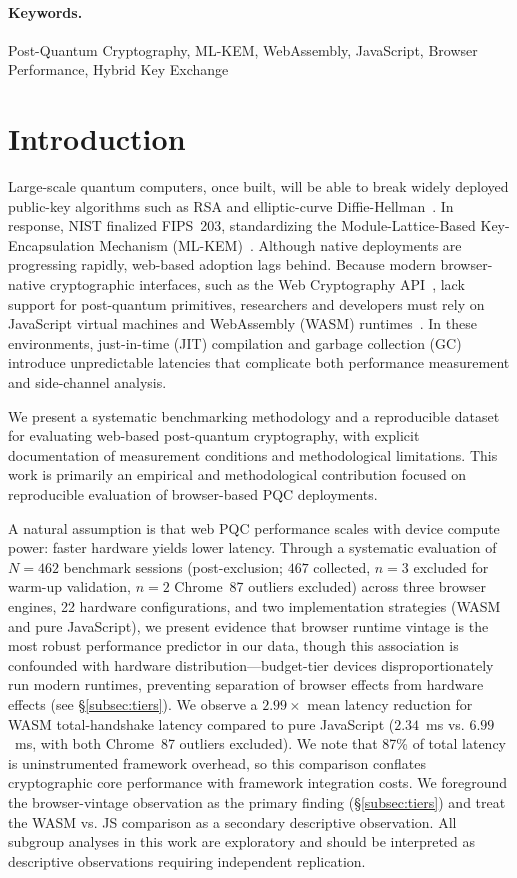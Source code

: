 \documentclass[11pt,a4paper]{article}
\begin{document}
\paragraph{Keywords.} Post-Quantum Cryptography, ML-KEM, WebAssembly, JavaScript, Browser Performance, Hybrid Key Exchange

\section{Introduction}
\label{sec:introduction}

Large-scale quantum computers, once built, will be able to break widely deployed public-key algorithms such as RSA and elliptic-curve Diffie-Hellman~\cite{shor1994algorithms}. In response, NIST finalized FIPS~203, standardizing the Module-Lattice-Based Key-Encapsulation Mechanism (ML-KEM)~\cite{NIST-FIPS-203}. Although native deployments are progressing rapidly, web-based adoption lags behind. Because modern browser-native cryptographic interfaces, such as the Web Cryptography API~\cite{W3C-WebCrypto}, lack support for post-quantum primitives, researchers and developers must rely on JavaScript virtual machines and WebAssembly (WASM) runtimes~\cite{haas2017webassembly}. In these environments, just-in-time (JIT) compilation and garbage collection (GC) introduce unpredictable latencies that complicate both performance measurement and side-channel analysis.

We present a systematic benchmarking methodology and a reproducible dataset for evaluating web-based post-quantum cryptography, with explicit documentation of measurement conditions and methodological limitations. This work is primarily an empirical and methodological contribution focused on reproducible evaluation of browser-based PQC deployments.

A natural assumption is that web PQC performance scales with device compute power: faster hardware yields lower latency. Through a systematic evaluation of $N=462$ benchmark sessions (post-exclusion; $467$ collected, $n=3$ excluded for warm-up validation, $n=2$ Chrome~87 outliers excluded) across three browser engines, 22 hardware configurations, and two implementation strategies (WASM and pure JavaScript), we present evidence that browser runtime vintage is the most robust performance predictor in our data, though this association is confounded with hardware distribution---budget-tier devices disproportionately run modern runtimes, preventing separation of browser effects from hardware effects (see \S\ref{subsec:tiers}). We observe a $2.99\times$ mean latency reduction for WASM total-handshake latency compared to pure JavaScript ($2.34$~ms vs. $6.99$~ms, with both Chrome~87 outliers excluded). We note that 87\% of total latency is uninstrumented framework overhead, so this comparison conflates cryptographic core performance with framework integration costs. We foreground the browser-vintage observation as the primary finding (\S\ref{subsec:tiers}) and treat the WASM vs. JS comparison as a secondary descriptive observation. All subgroup analyses in this work are exploratory and should be interpreted as descriptive observations requiring independent replication.
\end{document}
